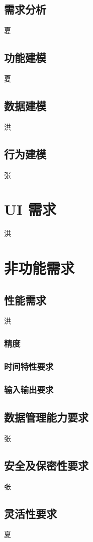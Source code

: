 \documentclass[UTF8]{ctexart}
\begin{document}
\subsection{需求分析}
夏
\subsection{功能建模}
夏
\subsection{数据建模}
洪
\subsection{行为建模}
张

\section{UI 需求}
洪

\section{非功能需求}
\subsection{性能需求}
洪
\subsubsection{精度}

\subsubsection{时间特性要求}

\subsubsection{输入输出要求}

\subsection{数据管理能力要求}
张
\subsection{安全及保密性要求}
张
\subsection{灵活性要求}
夏
\end{document}
